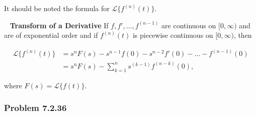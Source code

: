 It should be noted the formula for $\mathscr{L} \{ f^{\left(n\right)}\left(t\right) \}$.

\begin{boxedtheorem}[7.2.2] \hypertarget{def:Theorem 7.2.2}{}
  \ \newline
  \textbf{Transform of a Derivative} \newline
  If $f, f', \dots, f^{(n-1)}$ are continuous on $[0, \infty)$ and are of exponential order
  and if $f^{(n)}(t)$ is piecewise continuous on $[0, \infty)$, then

  \vspace{-0.5cm}
  \begin{align}
    \mathscr{L}\{f^{(n)}(t)\} &= s^n F(s) - s^{n-1} f(0) - s^{n-2} f'(0) - \dots - f^{(n-1)}(0) \\
                              &= s^n F(s) -\sum_{k=1}^{n}s^{\left(k-1\right)}f^{\left(n-k\right)}(0),
  \end{align}

  where $F(s) = \mathscr{L}\{f(t)\}$. 
\end{boxedtheorem}

  \newpage
  \subsubsection*{Problem 7.2.36}
  \vspace{-0.5cm}

